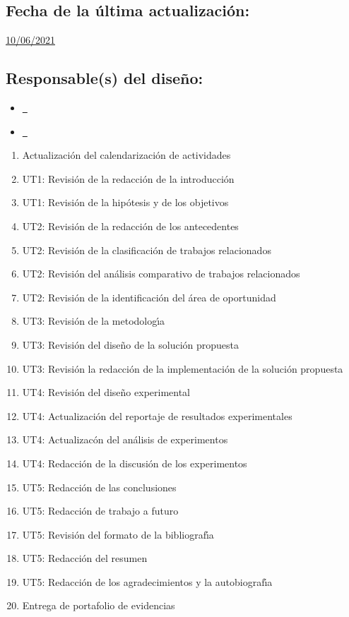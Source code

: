 \documentclass[10 pt]{article}
\begin{document}
\subsection{Fecha de la \'{u}ltima actualizaci\'{o}n:} \underline{10/06/2021}
\subsection{Responsable(s) del dise\~{n}o:}
\begin{itemize}[label={}]
\item \underline{\nroger~\roger}
\item \underline{\nelisa~\elisa}
\end{itemize}
\newpage



\begin{enumerate}[itemsep=-2pt]
\item Actualizaci\'{o}n del calendarizaci\'{o}n de actividades
\item UT1: Revisi\'{o}n de la redacci\'{o}n de la introducci\'{o}n
\item UT1: Revisi\'{o}n de la hip\'{o}tesis y de los objetivos
\item UT2: Revisi\'{o}n de la redacci\'{o}n de los antecedentes
\item UT2: Revisi\'{o}n de la clasificaci\'{o}n de trabajos relacionados
\item UT2: Revisi\'{o}n del an\'{a}lisis comparativo de trabajos relacionados
\item UT2: Revisi\'{o}n de la identificaci\'{o}n del \'{a}rea de oportunidad
\item UT3: Revisi\'{o}n de la metodolog\'{\i}a
\item UT3: Revisi\'{o}n del dise\~{n}o de la soluci\'{o}n propuesta
\item UT3: Revisi\'{o}n la redacci\'{o}n de la implementaci\'{o}n de la soluci\'{o}n propuesta
\item UT4: Revisi\'{o}n del dise\~{n}o experimental
\item UT4: Actualizaci\'{o}n del reportaje de resultados experimentales
\item UT4: Actualizac\'{o}n del an\'{a}lisis de experimentos
\item UT4: Redacci\'{o}n de la discusi\'{o}n de los experimentos
\item UT5: Redacci\'{o}n de las conclusiones
\item UT5: Redacci\'{o}n de trabajo a futuro
\item UT5: Revisi\'{o}n del formato de la bibliograf\'{\i}a
\item UT5: Redacci\'{o}n del resumen
\item UT5: Redacci\'{o}n de los agradecimientos y la autobiograf\'{\i}a
\item Entrega de portafolio de evidencias
\end{enumerate}
\end{document}
